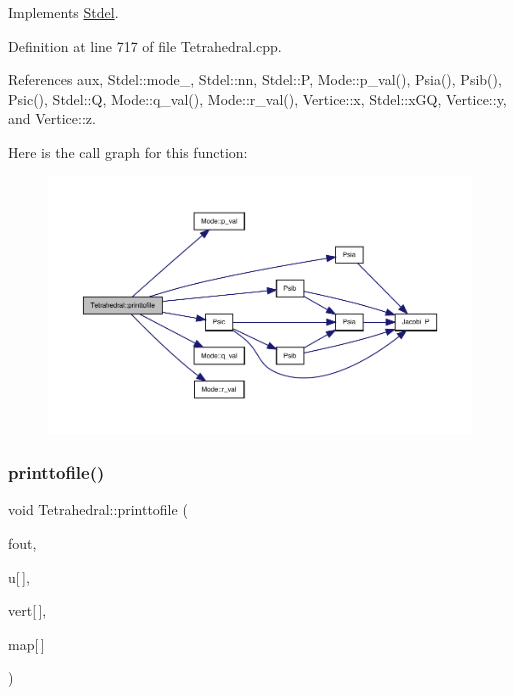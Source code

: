 Implements \hyperlink{classStdel_a315869f4c1fe1fdf4911c0d4ab092176}{Stdel}.



Definition at line 717 of file Tetrahedral.\+cpp.



References aux, Stdel\+::mode\+\_\+, Stdel\+::nn, Stdel\+::P, Mode\+::p\+\_\+val(), Psia(), Psib(), Psic(), Stdel\+::Q, Mode\+::q\+\_\+val(), Mode\+::r\+\_\+val(), Vertice\+::x, Stdel\+::x\+GQ, Vertice\+::y, and Vertice\+::z.

Here is the call graph for this function\+:
\nopagebreak
\begin{figure}[H]
\begin{center}
\leavevmode
\includegraphics[width=350pt]{classTetrahedral_a1ebce59e415a8c8fa52b453439fc06ee_cgraph}
\end{center}
\end{figure}
\mbox{\label{classTetrahedral_a615fe4c0df26ac87f46640c82fbe12b6}} 
\subsubsection{\texorpdfstring{printtofile()}{printtofile()}\hspace{0.1cm}{\footnotesize\ttfamily [2/2]}}
{\footnotesize\ttfamily void Tetrahedral\+::printtofile (\begin{DoxyParamCaption}\item[{F\+I\+LE $\ast$}]{fout,  }\item[{const double}]{u\mbox{[}$\,$\mbox{]},  }\item[{const \hyperlink{structVertice}{Vertice}}]{vert\mbox{[}$\,$\mbox{]},  }\item[{const int}]{map\mbox{[}$\,$\mbox{]} }\end{DoxyParamCaption})\hspace{0.3cm}{\ttfamily [virtual]}}



